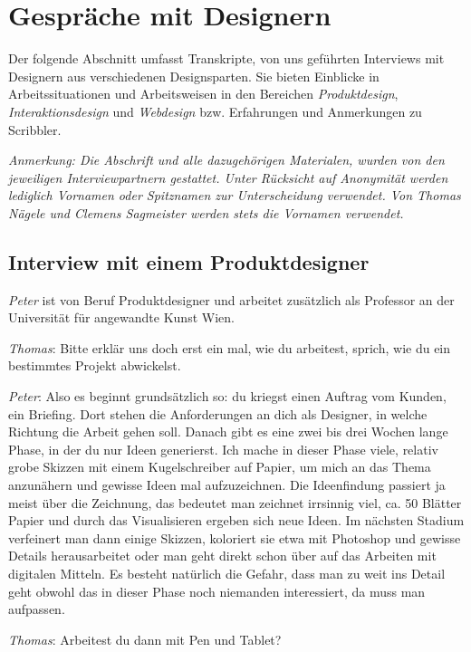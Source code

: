 \chapter{Gespr{\"a}che mit Designern}
Der folgende Abschnitt umfasst Transkripte, von uns geführten Interviews mit Designern aus verschiedenen Designsparten. Sie bieten Einblicke in Arbeitssituationen und Arbeitsweisen in den Bereichen \emph{Produktdesign}, \emph{Interaktionsdesign} und \emph{Webdesign} bzw. Erfahrungen und Anmerkungen zu Scribbler.

\medskip \emph{Anmerkung: Die Abschrift und alle dazugehörigen Materialen, wurden von den jeweiligen Interviewpartnern gestattet. Unter Rücksicht auf Anonymität werden lediglich Vornamen oder Spitznamen zur Unterscheidung verwendet. Von Thomas Nägele und Clemens Sagmeister werden stets die Vornamen verwendet.}

\section{Interview mit einem Produktdesigner}
\emph{Peter} ist von Beruf Produktdesigner und arbeitet zusätzlich als Professor an der Universität für angewandte Kunst Wien. 

\medskip \emph{Thomas}: Bitte erklär uns doch erst ein mal, wie du arbeitest, sprich, wie du ein bestimmtes Projekt abwickelst.

\medskip \emph{Peter}: Also es beginnt grundsätzlich so: du kriegst einen Auftrag vom Kunden, ein Briefing. Dort stehen die Anforderungen an dich als Designer, in welche Richtung die Arbeit gehen soll. Danach gibt es eine zwei bis drei Wochen lange Phase, in der du nur Ideen generierst. Ich mache in dieser Phase viele, relativ grobe Skizzen mit einem Kugelschreiber auf Papier, um mich an das Thema anzunähern und gewisse Ideen mal aufzuzeichnen. Die Ideenfindung passiert ja meist über die Zeichnung, das bedeutet man zeichnet irrsinnig viel, ca. 50 Blätter Papier und durch das Visualisieren ergeben sich neue Ideen. Im nächsten Stadium verfeinert man dann einige Skizzen, koloriert sie etwa mit Photoshop und gewisse Details herausarbeitet oder man geht direkt schon über auf das Arbeiten mit digitalen Mitteln. Es besteht natürlich die Gefahr, dass man zu weit ins Detail geht obwohl das in dieser Phase noch niemanden interessiert, da muss man aufpassen. 

\medskip \emph{Thomas}: Arbeitest du dann mit Pen und Tablet?

